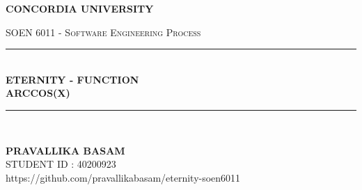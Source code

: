 \documentclass{article}
\begin{document}
    \begin{titlepage}
        \centering
        \vspace*{0.5 cm}
        \begin{center}
            \textsc{\huge \textbf{CONCORDIA UNIVERSITY}}\\[1.0 cm]
        \end{center}
        \textsc{\Large  SOEN 6011 - Software Engineering Process }\\[1.0 cm]
        \rule{\linewidth}{0.2 mm} \\[1.0 cm]
        { \huge \textbf {ETERNITY - FUNCTION}}\\[0.2 cm]
        { \huge \textbf{ARCCOS(X)}}\\[1.0 cm]
        \rule{\linewidth}{0.2 mm} \\[1.0 cm]
        \begin{center}   {\Large \textbf{PRAVALLIKA BASAM}}
            \\[0.5 cm]
            {\large STUDENT ID : 40200923 }\\[0.5 cm]
            \vspace*{0.5 cm}
            {\large https://github.com/pravallikabasam/eternity-soen6011}
        \end{center}
    \end{titlepage}
\end{document}
